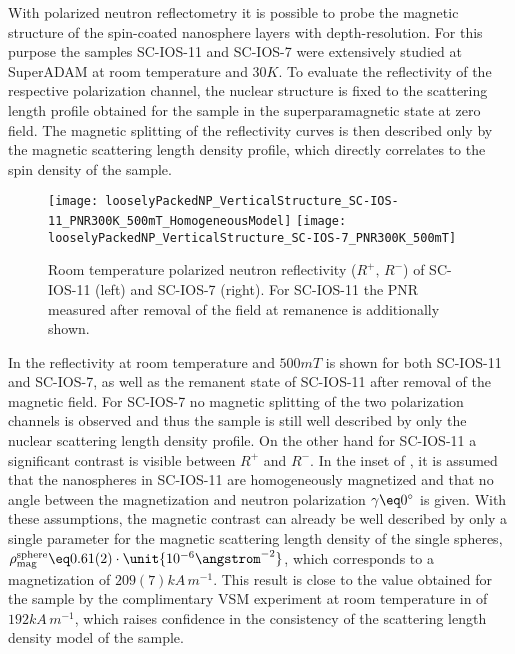 \documentclass[\main/dresen_thesis.tex]{subfiles}
\begin{document}
  \label{sec:looselyPackedNS:layers:pnr}
  With polarized neutron reflectometry it is possible to probe the magnetic structure of the spin-coated nanosphere layers with depth-resolution.
  For this purpose the samples SC-IOS-11 and SC-IOS-7 were extensively studied at SuperADAM at room temperature and $30 \unit{K}$.
  To evaluate the reflectivity of the respective polarization channel, the nuclear structure is fixed to the scattering length profile obtained for the sample in the superparamagnetic state at zero field.
  The magnetic splitting of the reflectivity curves is then described only by the magnetic scattering length density profile, which directly correlates to the spin density of the sample.

  \begin{figure}[tb]
    \centering
    \texttt{[image: looselyPackedNP\_VerticalStructure\_SC-IOS-11\_PNR300K\_500mT\_HomogeneousModel]}
    \texttt{[image: looselyPackedNP\_VerticalStructure\_SC-IOS-7\_PNR300K\_500mT]}
    \caption{\label{fig:looselyPackedNP:layer:pnrRoomTemperatureMagnetic}Room temperature polarized neutron reflectivity ($R^{+},\, R^{-}$) of SC-IOS-11 (left) and SC-IOS-7 (right). For SC-IOS-11 the PNR measured after removal of the field at remanence is additionally shown.}
  \end{figure}
  In  the reflectivity at room temperature and $500 \unit{mT}$ is shown for both SC-IOS-11 and SC-IOS-7, as well as the remanent state of SC-IOS-11 after removal of the magnetic field.
  For SC-IOS-7 no magnetic splitting of the two polarization channels is observed and thus the sample is still well described by only the nuclear scattering length density profile.
  On the other hand for SC-IOS-11 a significant contrast is visible between $R^{+}$ and $R^{-}$.
  In the inset of , it is assumed that the nanospheres in SC-IOS-11 are homogeneously magnetized and that no angle between the magnetization and neutron polarization $\gamma \eq 0 ^\circ$ is given.
  With these assumptions, the magnetic contrast can already be well described by only a single parameter for the magnetic scattering length density of the single spheres, $\rho_\mathrm{mag}^\mathrm{sphere} \eq 0.61(2) \cdot \unit{10^{-6} \angstrom^{-2}}$, which corresponds to a magnetization of $209(7) \unit{kA \, m^{-1}}$.
  This result is close to the value obtained for the sample by the complimentary VSM experiment at room temperature in  of $192 \unit{kA \,m^{-1}}$, which raises confidence in the consistency of the scattering length density model of the sample.
\end{document}
